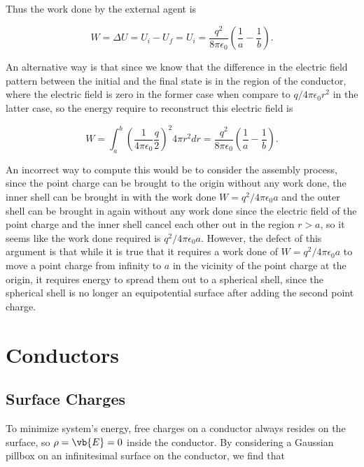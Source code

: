 \documentclass[english,a4paper,12pt]{report}
\begin{document}
{Thus the work done by the external agent is

\begin{equation}
    W = \Delta U = U_{i} - U_{f} = U_{i} = \frac{q^2}{8\pi \epsilon_0} \left(\frac{1}{a} - \frac{1}{b} \right) .
\end{equation}

An alternative way is that since we know that the difference in the electric field pattern between the initial and the final state is in the region of the conductor, where the electric field is zero in the former case when compare to \(q/4\pi \epsilon_0 r^2 \) in the latter case, so the energy require to reconstruct this electric field is 

\begin{equation}
    W = \int_{a}^{b} \left(\frac{1}{4\pi\epsilon_0} \frac{q}{2} \right)^2 4\pi r^2dr =   \frac{q^2}{8\pi \epsilon_0} \left(\frac{1}{a} - \frac{1}{b} \right) .
\end{equation}

An incorrect way to compute this would be to consider the assembly process, since the point charge can be brought to the origin without any work done, the inner shell can be brought in with the work done \( W =  q^2/4\pi \epsilon_0 a\) and the outer shell can be brought in again without any work done since the electric field of the point charge and the inner shell cancel each other out in the region \(r > a\), so it seems like the work done required is \( q^2 /4\pi \epsilon_0 a\). However, the defect of this argument is that while it is true that it requires a work done of \(W = q^2/4\pi \epsilon_0 a \) to move a point charge from infinity to \(a\) in the vicinity of the point charge at the origin, it requires energy to spread them out to a spherical shell, since the spherical shell is no longer an equipotential surface after adding the second point charge.}





\section{Conductors}

\subsection{Surface Charges} \label{surcha} 

To minimize system's energy, free charges on a conductor always resides on the surface, so \(\rho  = \vb{E}  = 0 \) inside the conductor. By considering a Gaussian pillbox on an infinitesimal surface on the conductor, we find that 
\end{document}
